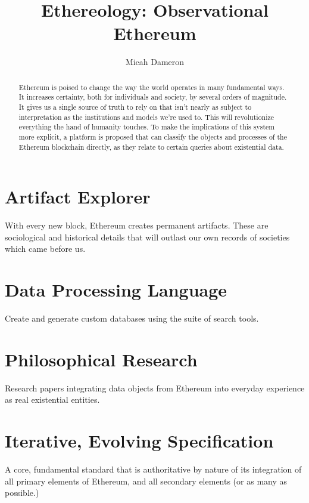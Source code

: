 \documentclass[a4paper,oneside]{article}
\title{Ethereology: Observational Ethereum}
\author{Micah Dameron}
\begin{document}
\maketitle

\begin{abstract}
Ethereum is poised to change the way the world operates in many fundamental ways. It increases certainty, both for individuals and society, by several orders of magnitude. It gives us a single source of truth to rely on that isn't nearly as subject to interpretation as the institutions and models we're used to. This will revolutionize everything the hand of humanity touches. To make the implications of this system more explicit, a platform is proposed that can classify the objects and processes of the Ethereum blockchain directly, as they relate to certain queries about existential data.

\end{abstract}

\hfill

\begin{multicols}{2}

\section{Artifact Explorer}
With every new block, Ethereum creates permanent artifacts. These are sociological and historical details that will outlast our own records of societies which came before us.

\section{Data Processing Language}
Create and generate custom databases using the suite of search tools.

\section{Philosophical Research}
Research papers integrating data objects from Ethereum into everyday experience as real existential entities.

\section{Iterative, Evolving Specification}
A core, fundamental standard that is authoritative by nature of its integration of all primary elements of Ethereum, and all secondary elements (or as many as possible.)


\end{multicols}
\end{document}
